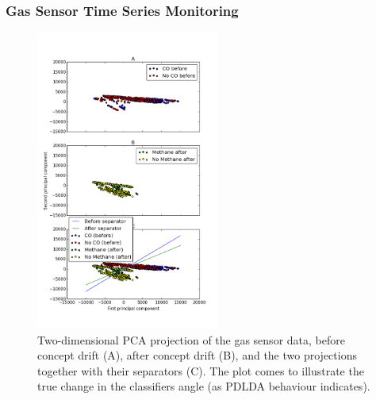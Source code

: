 \documentclass[11pt,twocolumn,varwidth=true,a4paper,fleqn]{article}
\begin{document}


\subsubsection{Gas Sensor Time Series Monitoring} 

\begin{figure}[h!]
\centering
\includegraphics[width=60mm]{BigGas/showData.png}
\caption{Two-dimensional PCA projection of the gas sensor data, 
before concept drift (A), after concept drift (B), 
and the two projections together with their separators (C). 
The plot comes to illustrate the true change in the classifiers angle (as PDLDA
behaviour indicates).}
\label{BigGasShowData}
\end{figure}
\end{document}
